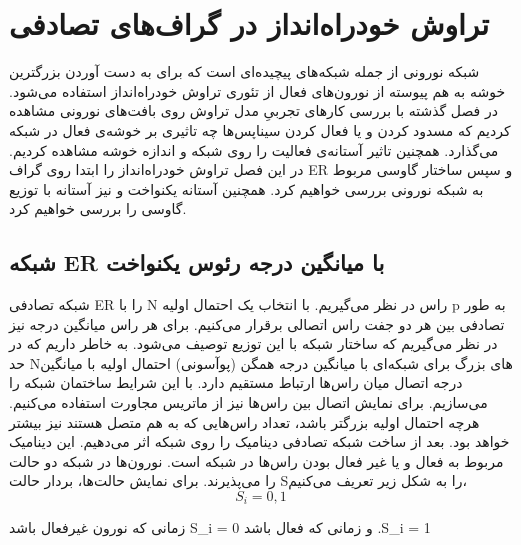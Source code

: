\chapter{تراوش خود‌راه‌انداز در  گراف‌های تصادفی}
شبکه نورونی از جمله شبکه‌های پیچیده‌ای است که برای به دست آوردن بزرگترین خوشه به هم پیوسته از نورون‌های فعال  از تئوری تراوش خود‌راه‌انداز استفاده می‌شود.
در فصل گذشته با بررسی کار‌های تجربیِ  مدل تراوش  روی بافت‌های نورونی مشاهده کردیم که مسدود کردن و یا فعال کردن سیناپس‌ها چه تاثیری بر خوشه‌ی فعال در شبکه می‌گذارد. همچنین تاثیر آستانه‌ی فعالیت را روی شبکه و اندازه خوشه مشاهده کردیم. در این فصل  تراوش خودراه‌انداز را ابتدا روی  گراف ER و سپس  ساختار گاوسی  مربوط به شبکه نورونی بررسی خواهیم کرد. همچنین آستانه یکنواخت و نیز آستانه با توزیع گاوسی را بررسی خواهیم کرد. 

\section{شبکه ER با میانگین درجه رئوس یکنواخت}
شبکه تصادفی ER را با N راس در نظر می‌گیریم. با انتخاب یک  احتمال اولیه p به طور تصادفی بین هر دو جفت راس اتصالی برقرار می‌کنیم. برای هر راس میانگین درجه نیز در نظر می‌گیریم که ساختار شبکه با این توزیع توصیف می‌شود. به خاطر داریم که در حد N‌های بزرگ  برای شبکه‌‌ای با میانگین درجه همگن (پوآسونی) احتمال  اولیه با میانگین درجه اتصال میان راس‌ها ارتباط مستقیم دارد.
با این شرایط ساختمان شبکه را می‌سازیم. برای نمایش اتصال بین راس‌ها نیز از ماتریس مجاورت استفاده می‌کنیم.
 هرچه احتمال اولیه بزرگتر باشد، تعداد راس‌هایی که به هم متصل هستند نیز بیشتر خواهد بود.
بعد از ساخت شبکه تصادفی دینامیک را روی شبکه اثر می‌دهیم. این دینامیک مربوط به فعال و یا غیر فعال بودن راس‌ها در شبکه است. نورون‌ها در شبکه دو حالت را می‌پذیرند. برای نمایش حالت‌ها، بردار حالت Sرا به شکل زیر تعریف می‌کنیم،
\begin{equation}
{S_{i} = 0 , 1}
\end{equation}

زمانی که نورون غیرفعال باشد S_{i} = 0  و زمانی که فعال باشد .S_{i} = 1 


